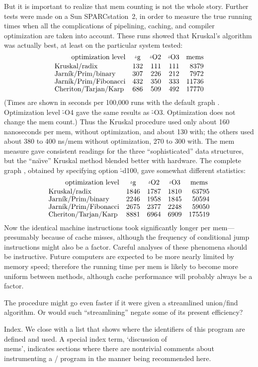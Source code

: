 But it is important to realize that mem counting is not the whole story.
Further tests were made on a Sun SPARCstation~2, in order to measure the true
running times when all the complications of pipelining, caching, and compiler
optimization are taken into account. These runs showed that Kruskal's
algorithm was actually best, at least on the particular system tested:
$$\advance\abovedisplayskip-5pt
\advance\belowdisplayskip-5pt
\advance\baselineskip-1pt
\vbox{\halign{#\hfil&&\quad\hfil#\cr
\hfill optimization level&\.{-g}\hfil&\.{-O2}\hfil&\.{-O3}\hfil&mems\hfil\cr
\noalign{\vskip2pt}
Kruskal/radix&132&111&111&8379\cr
Jarn{\'\i}k/Prim/binary&307&226&212&7972\cr
Jarn{\'\i}k/Prim/Fibonacci&432&350&333&11736\cr
Cheriton/Tarjan/Karp&686&509&492&17770\cr}}$$
(Times are shown in seconds per 100,000 runs with the default graph
. Optimization
level \.{-O4} gave the same results
as \.{-O3}. Optimization does not change the mem count.) Thus the Kruskal
procedure used only about 160 nanoseconds per mem, without optimization,
and about 130 with; the others used about 380 to 400 ns/mem without
optimization, 270 to 300 with. The mem measure gave consistent readings for
the three ``sophisticated'' data structures, but the ``na{\"\i}ve'' Kruskal
method blended better with hardware. The complete graph , obtained by specifying option %
\.{-d100}, gave somewhat different
statistics:
$$\advance\abovedisplayskip-5pt
\advance\belowdisplayskip-5pt
\advance\baselineskip-1pt
\vbox{\halign{#\hfil&&\quad\hfil#\cr
\hfill optimization level&\.{-g}\hfil&\.{-O2}\hfil&\.{-O3}\hfil&mems\hfil\cr
\noalign{\vskip2pt}
Kruskal/radix&1846&1787&1810&63795\cr
Jarn{\'\i}k/Prim/binary&2246&1958&1845&50594\cr
Jarn{\'\i}k/Prim/Fibonacci&2675&2377&2248&59050\cr
Cheriton/Tarjan/Karp&8881&6964&6909&175519\cr}}$$
Now the identical machine instructions took significantly longer per
mem---presumably because of cache misses, although the frequency of
conditional jump instructions might also be a factor.  Careful analyses
of these phenomena should be instructive.  Future computers are
expected to be more nearly limited by memory speed; therefore the running
time per mem is likely to become more uniform between methods, although
cache performance will probably always be a factor.

The  procedure might go even faster if it were
given a streamlined union/find algorithm. Or would such ``streamlining''
negate some of its present efficiency?

\fi

Index. We close with a list that shows where the identifiers of this
program are defined and used. A special index term, `discussion of \\{mems}',
indicates sections where there are nontrivial comments about instrumenting
a \CEE/ program in the manner being recommended here.
\fi

\inx
\fin
\con
